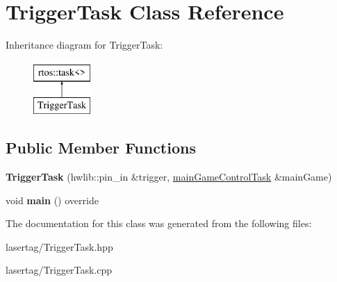 \hypertarget{class_trigger_task}{}\section{Trigger\+Task Class Reference}
\label{class_trigger_task}
Inheritance diagram for Trigger\+Task\+:\begin{figure}[H]
\begin{center}
\leavevmode
\includegraphics[height=2.000000cm]{class_trigger_task}
\end{center}
\end{figure}
\subsection*{Public Member Functions}
\begin{DoxyCompactItemize}
\item 
\mbox{\label{class_trigger_task_a24b003a4ce868e75e35ff442c597c750}} 
{\bfseries Trigger\+Task} (hwlib\+::pin\+\_\+in \&trigger, \mbox{\hyperlink{classmain_game_control_task}{main\+Game\+Control\+Task}} \&main\+Game)
\item 
\mbox{\label{class_trigger_task_a7a90964786348819cb2cf7e5a34cd69c}} 
void {\bfseries main} () override
\end{DoxyCompactItemize}


The documentation for this class was generated from the following files\+:\begin{DoxyCompactItemize}
\item 
lasertag/Trigger\+Task.\+hpp\item 
lasertag/Trigger\+Task.\+cpp\end{DoxyCompactItemize}
